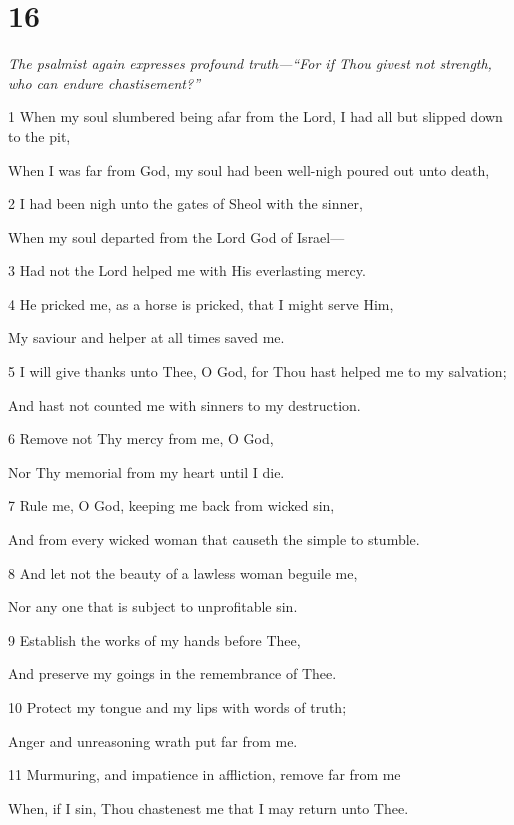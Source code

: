 \chapter{16}

\par \textit{The psalmist again expresses profound truth—“For if Thou givest not strength, who can endure chastisement?”}

\par 1 When my soul slumbered being afar from the Lord, I had all but slipped down to the pit,
\par  When I was far from God, my soul had been well-nigh poured out unto death,
\par 2 I had been nigh unto the gates of Sheol with the sinner,
\par  When my soul departed from the Lord God of Israel—
\par 3 Had not the Lord helped me with His everlasting mercy.
\par    
\par 4 He pricked me, as a horse is pricked, that I might serve Him,
\par  My saviour and helper at all times saved me.
\par 5 I will give thanks unto Thee, O God, for Thou hast helped me to my salvation;
\par  And hast not counted me with sinners to my destruction.
\par 6 Remove not Thy mercy from me, O God,
\par  Nor Thy memorial from my heart until I die.
\par 7 Rule me, O God, keeping me back from wicked sin,
\par  And from every wicked woman that causeth the simple to stumble.
\par 8 And let not the beauty of a lawless woman beguile me,
\par  Nor any one that is subject to unprofitable sin.
\par    
\par 9 Establish the works of my hands before Thee,
\par  And preserve my goings in the remembrance of Thee.
\par 10 Protect my tongue and my lips with words of truth;
\par  Anger and unreasoning wrath put far from me.
\par 11 Murmuring, and impatience in affliction, remove far from me
\par  When, if I sin, Thou chastenest me that I may return unto Thee.
